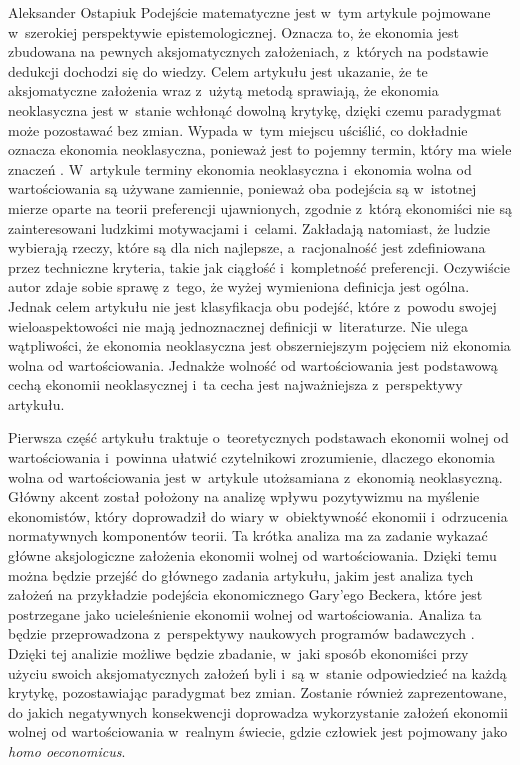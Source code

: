 \begin{artplenv}{Aleksander Ostapiuk}
Podejście matematyczne jest w~tym artykule pojmowane w~szerokiej perspektywie epistemologicznej. Oznacza to, że ekonomia
jest zbudowana na pewnych aksjomatycznych założeniach, z~których na podstawie dedukcji dochodzi się do wiedzy. Celem
artykułu jest ukazanie, że te aksjomatyczne założenia wraz z~użytą metodą sprawiają, że ekonomia neoklasyczna
jest w~stanie wchłonąć dowolną krytykę, dzięki czemu paradygmat może pozostawać bez zmian. Wypada w~tym miejscu
uściślić, co dokładnie oznacza ekonomia neoklasyczna, ponieważ jest to pojemny termin, który ma wiele znaczeń
\parencite{colander_death_2000}.
W~artykule terminy ekonomia neoklasyczna i~ekonomia wolna od wartościowania
są używane zamiennie, ponieważ oba podejścia są w~istotnej mierze oparte na teorii preferencji ujawnionych, zgodnie z~którą
ekonomiści nie są zainteresowani ludzkimi motywacjami i~celami. Zakładają natomiast, że ludzie wybierają rzeczy, które
są dla nich najlepsze, a~racjonalność jest zdefiniowana przez techniczne kryteria, takie jak ciągłość i~kompletność
preferencji. Oczywiście autor zdaje sobie sprawę z~tego, że wyżej wymieniona definicja jest ogólna. Jednak celem
artykułu nie jest klasyfikacja obu podejść, które z~powodu swojej wieloaspektowości nie mają jednoznacznej
definicji w~literaturze. Nie ulega wątpliwości, że ekonomia neoklasyczna jest obszerniejszym pojęciem niż ekonomia wolna od
wartościowania. Jednakże wolność od wartościowania jest podstawową cechą ekonomii neoklasycznej
\parencite{sen_rational_1977,putnam_end_2011,hausman_etyka_2017_ost}
i~ta cecha jest
najważniejsza z~perspektywy artykułu. 

Pierwsza część artykułu traktuje o~teoretycznych podstawach ekonomii wolnej od wartościowania i~powinna ułatwić
czytelnikowi zrozumienie, dlaczego ekonomia wolna od wartościowania jest w~artykule utożsamiana z~ekonomią
neoklasyczną. Główny akcent został położony na analizę wpływu pozytywizmu na myślenie ekonomistów, który doprowadził do
wiary w~obiektywność ekonomii i~odrzucenia normatywnych komponentów teorii. Ta krótka analiza ma za zadanie wykazać
główne aksjologiczne założenia ekonomii wolnej od wartościowania. Dzięki temu można będzie przejść do głównego zadania
artykułu, jakim jest analiza tych założeń na przykładzie podejścia ekonomicznego Gary'ego Beckera, które jest
postrzegane jako ucieleśnienie ekonomii wolnej od wartościowania. Analiza ta będzie
przeprowadzona z~perspektywy naukowych programów badawczych
\parencite{lakatos_methodology_1980,lakatos_pisma_1995}.
Dzięki tej analizie możliwe
będzie zbadanie, w~jaki sposób ekonomiści przy użyciu swoich aksjomatycznych założeń byli i~są w~stanie odpowiedzieć na
każdą krytykę, pozostawiając paradygmat bez zmian. Zostanie również zaprezentowane, do jakich negatywnych konsekwencji
doprowadza wykorzystanie założeń ekonomii wolnej od wartościowania w~realnym świecie, gdzie człowiek jest pojmowany
jako \textit{homo oeconomicus}.


\end{artplenv}

